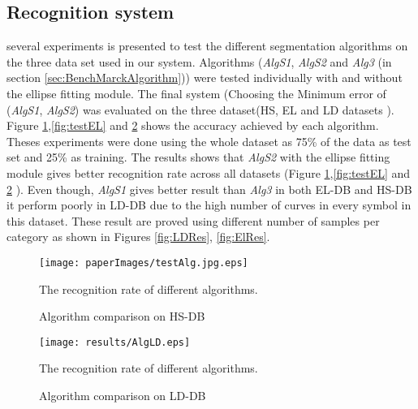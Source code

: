 \subsection {Recognition system}
\label{sec:RecognitionAlgorithms}

several experiments is presented to test the different segmentation algorithms on the three data set used in our system. Algorithms (\textsl{AlgS1}, \textsl{AlgS2} and \textsl{Alg3} (in section \ref{sec:BenchMarckAlgorithm})) were tested individually with and without the ellipse fitting module. The final system (Choosing the Minimum error of (\textsl{AlgS1}, \textsl{AlgS2}) was evaluated on the three dataset(HS, EL and LD datasets ). Figure \ref{fig:test1},\ref{fig:testEL} and \ref{fig:testLD} shows the accuracy achieved by each algorithm. Theses experiments were done using the whole dataset as 75\% of the data as test set and 25\% as training. The results shows that \textsl{AlgS2} with the ellipse fitting module gives better recognition rate across all datasets (Figure \ref{fig:test1},\ref{fig:testEL} and \ref{fig:testLD} ). Even though, \textsl{AlgS1} gives better result than \textsl{Alg3} in both EL-DB and HS-DB it perform poorly in LD-DB due to the high number of curves in every symbol in this dataset. These result are proved using different number of samples per category as shown in Figures \ref{fig:LDRes}, \ref{fig:ElRes}. 

\begin{figure}
	\centering		
	 \texttt{[image: paperImages/testAlg.jpg.eps]}
	 	\caption{Algorithm comparison on HS-DB} The recognition rate of different algorithms. 
	 	\label{fig:test1}
\end{figure} 
\begin{figure}
	\centering		
	 \texttt{[image: results/AlgLD.eps]}
	 	\caption{Algorithm comparison on LD-DB} The recognition rate of different algorithms. 
	 	\label{fig:testLD}
\end{figure} 


